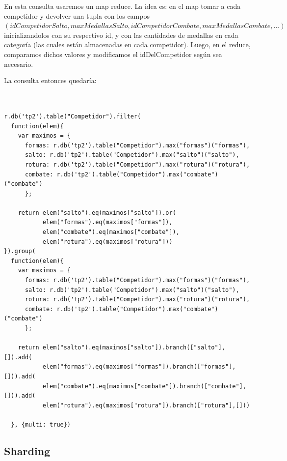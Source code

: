 \begin{itemize}
{En esta consulta usaremos un map reduce. La idea es: en el map tomar a 
cada competidor y devolver una tupla con los campos 
\\$(idCompetidorSalto,maxMedallasSalto,idCompetidorCombate,maxMedallasCombate,...)$
 inicializandolos con su respectivo id, y con las cantidades de medallas 
 en cada categoría (las cuales están almacenadas en cada competidor). 
Luego, en el reduce, comparamos dichos valores y modificamos el idDelCompetidor
 según sea necesario.

La consulta entonces quedaría:\\ \\

\begin{verbatim}

r.db('tp2').table("Competidor").filter(
  function(elem){
    var maximos = {
      formas: r.db('tp2').table("Competidor").max("formas")("formas"),
      salto: r.db('tp2').table("Competidor").max("salto")("salto"),
      rotura: r.db('tp2').table("Competidor").max("rotura")("rotura"),
      combate: r.db('tp2').table("Competidor").max("combate")("combate")
      };
    
    return elem("salto").eq(maximos["salto"]).or(
           elem("formas").eq(maximos["formas"]),
           elem("combate").eq(maximos["combate"]),
           elem("rotura").eq(maximos["rotura"]))
}).group(
  function(elem){
    var maximos = {
      formas: r.db('tp2').table("Competidor").max("formas")("formas"),
      salto: r.db('tp2').table("Competidor").max("salto")("salto"),
      rotura: r.db('tp2').table("Competidor").max("rotura")("rotura"),
      combate: r.db('tp2').table("Competidor").max("combate")("combate")
      };
    
    return elem("salto").eq(maximos["salto"]).branch(["salto"],[]).add(
           elem("formas").eq(maximos["formas"]).branch(["formas"],[])).add(
           elem("combate").eq(maximos["combate"]).branch(["combate"],[])).add(
           elem("rotura").eq(maximos["rotura"]).branch(["rotura"],[]))
    
  }, {multi: true})

\end{verbatim}
}

\end{itemize}

\subsection{Sharding}

